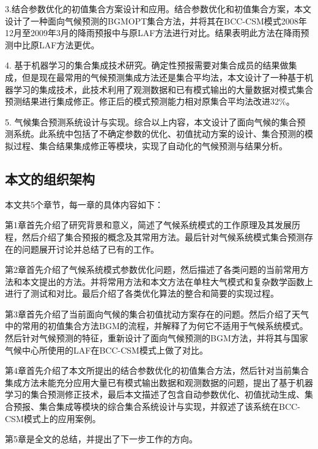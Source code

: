 3.结合参数优化的初值集合方案设计和应用。结合参数优化和初值集合方案，本文设计了一种面向气候预测的BGMOPT集合方法，并将其在BCC-CSM模式2008年12月至2009年3月的降雨预报中与原LAF方法进行对比。结果表明此方法在降雨预测中比原LAF方法更优。

4. 基于机器学习的集合集成技术研究。确定性预报需要对集合成员的结果做集成，但是现在最常用的气候预测集成方法还是集合平均法，本文设计了一种基于机器学习的集成技术，此技术利用了观测数据和已有模式输出的大量数据对模式集合预测结果进行集成修正。修正后的模式预测能力相对原集合平均法改进32\%。

5. 气候集合预测系统设计与实现。综合以上内容，本文设计了面向气候的集合预测系统。此系统中包括了不确定参数的优化、初值扰动方案的设计、集合预测的模拟过程、集合结果集成修正等模块，实现了自动化的气候预测与结果分析。

\subsection{本文的组织架构}
本文共5个章节，每一章的具体内容如下：

第1章首先介绍了研究背景和意义，简述了气候系统模式的工作原理及其发展历程，然后介绍了集合预报的概念及其常用方法。最后针对气候系统模式集合预测存在的问题展开讨论并总结了已有的工作。

第2章首先介绍了气候系统模式参数优化问题，然后描述了各类问题的当前常用方法和本文提出的方法。并将常用方法和本文方法在单柱大气模式和复杂数学函数上进行了测试和对比。最后介绍了各类优化算法的整合和简要的实现过程。

第3章首先介绍了当前面向气候的集合初值扰动方案存在的问题。然后介绍了天气中的常用的初值集合方法BGM的流程，并解释了为何它不适用于气候系统模式。然后针对气候预测的特征，重新设计了面向气候预测的BGM方法，并将其与国家气候中心所使用的LAF在BCC-CSM模式上做了对比。

第4章首先介绍了本文所提出的结合参数优化的初值集合方法，然后针对当前集合集成方法未能充分应用大量已有模式输出数据和观测数据的问题，提出了基于机器学习的集合预测修正技术，最后本文描述了包含自动参数优化、初值扰动生成、集合预报、集合集成等模块的综合集合系统设计与实现，并叙述了该系统在BCC-CSM模式上的应用案例。

第5章是全文的总结，并提出了下一步工作的方向。
